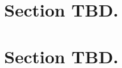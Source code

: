 \setcounter{page}{1}
\pagestyle{fancy}
\fancyhead[L]{\myassignment  \hspace*{1.5mm}- \mycourse} 
\fancyhead[R]{\mydate}


\section{Section TBD.}
\lipsum[1-4]
\cite{aha1991}


\section{Section TBD.}
\lipsum[1-4]



